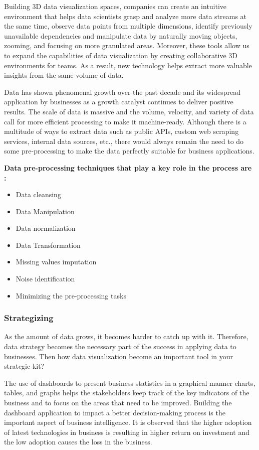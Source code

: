 \documentclass[]{book}
\providecommand{\tightlist}{%
  \setlength{\itemsep}{0pt}\setlength{\parskip}{0pt}}
\begin{document}
Building 3D data visualization spaces, companies can create an intuitive environment that helps data scientists grasp and analyze more data streams at the same time, observe data points from multiple dimensions, identify previously unavailable dependencies and manipulate data by naturally moving objects, zooming, and focusing on more granulated areas. Moreover, these tools allow us to expand the capabilities of data visualization by creating collaborative 3D environments for teams. As a result, new technology helps extract more valuable insights from the same volume of data.

Data has shown phenomenal growth over the past decade and its widespread application by businesses as a growth catalyst continues to deliver positive results. The scale of data is massive and the volume, velocity, and variety of data call for more efficient processing to make it machine-ready. Although there is a multitude of ways to extract data such as public APIs, custom web scraping services, internal data sources, etc., there would always remain the need to do some pre-processing to make the data perfectly suitable for business applications.

\textbf{Data pre-processing techniques that play a key role in the process are :}

\begin{itemize}
\tightlist
\item
  Data cleansing
\item
  Data Manipulation
\item
  Data normalization
\item
  Data Transformation
\item
  Missing values imputation
\item
  Noise identification
\item
  Minimizing the pre-processing tasks
\end{itemize}

\hypertarget{strategizing}{%
\subsubsection{Strategizing}\label{strategizing}}

As the amount of data grows, it becomes harder to catch up with it. Therefore, data strategy becomes the necessary part of the success in applying data to businesses. Then how data visualization become an important tool in your strategic kit?

The use of dashboards to present business statistics in a graphical manner charts, tables, and graphs helps the stakeholders keep track of the key indicators of the business and to focus on the areas that need to be improved. Building the dashboard application to impact a better decision-making process is the important aspect of business intelligence. It is observed that the higher adoption of latest technologies in business is resulting in higher return on investment and the low adoption causes the loss in the business.
\end{document}
